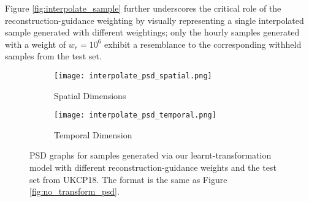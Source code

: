 \documentclass[ oneside,%
                    author={George Herbert},
                    degree={MSci},
                     title={Diffusion Models for Time-Evolving Precipitation Fields},
                  subtitle={}]{dissertation}
\begin{document}
Figure \ref{fig:interpolate_sample} further underscores the critical role of the reconstruction-guidance weighting by visually representing a single interpolated sample generated with different weightings; only the hourly samples generated with a weight of $w_r=10^6$ exhibit a resemblance to the corresponding withheld samples from the test set.

\begin{figure}[htbp]
      \centering
      \begin{subfigure}{.49\textwidth}
            \texttt{[image: interpolate\_psd\_spatial.png]}
            \caption{Spatial Dimensions}
            \label{fig:interpolate_psd_spatial}
      \end{subfigure}
      \begin{subfigure}{.49\textwidth}
            \texttt{[image: interpolate\_psd\_temporal.png]}
            \caption{Temporal Dimension}
            \label{fig:interpolate_psd_temporal}
      \end{subfigure}
      \caption{PSD graphs for samples generated via our learnt-transformation model with different reconstruction-guidance weights and the test set from UKCP18. The format is the same as Figure \ref{fig:no_transform_psd}.}
      \label{fig:interpolate_psd}
\end{figure}
\end{document}
